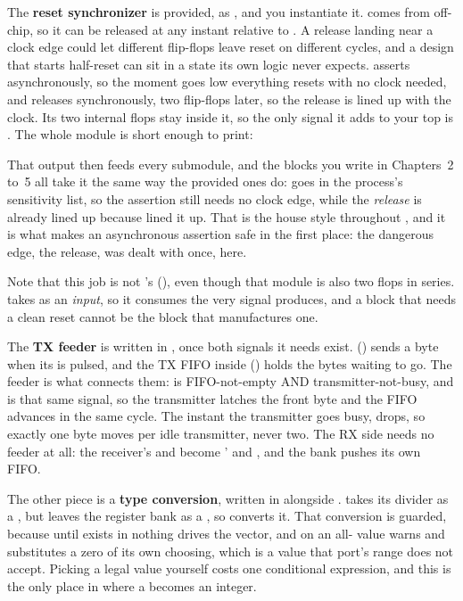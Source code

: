 The \textbf{reset synchronizer} is provided, as , and you instantiate it.
 comes from off-chip, so it can be released at any instant relative to . A
release landing near a clock edge could let different flip-flops leave reset on different cycles,
and a design that starts half-reset can sit in a state its own logic never expects.
 asserts asynchronously, so the moment  goes low everything resets
with no clock needed, and releases synchronously, two flip-flops later, so the release is lined up
with the clock. Its two internal flops stay inside it, so the only signal it adds to your top is
. The whole module is short enough to print:


\noindent That output then feeds every submodule, and the blocks you write in Chapters~2 to~5 all
take it the same way the provided ones do:  goes in the process's sensitivity
list, so the assertion still needs no clock edge, while the \emph{release} is already lined up
because  lined it up. That is the house style throughout , and it is what
makes an asynchronous assertion safe in the first place: the dangerous edge, the release, was dealt
with once, here.

Note that this job is not 's (), even though that module is also two flops in
series.  takes  as an \emph{input}, so it consumes the very signal
 produces, and a block that needs a clean reset cannot be the block that
manufactures one.

The \textbf{TX feeder} is written in , once both signals it needs exist. 
() sends a byte when its  is pulsed, and the TX FIFO inside 
() holds the bytes waiting to go. The feeder is what connects them:  is
FIFO-not-empty AND transmitter-not-busy, and  is that same signal, so the transmitter
latches the front byte and the FIFO advances in the same cycle. The instant the transmitter goes
busy,  drops, so exactly one byte moves per idle transmitter, never two. The RX side
needs no feeder at all: the receiver's  and  become '
 and , and the bank pushes its own FIFO.

The other piece is a \textbf{type conversion}, written in  alongside .
 takes its divider as a , but  leaves
the register bank as a , so  converts it. That
conversion is guarded, because until  exists in  nothing drives the
vector, and  on an all- value warns and substitutes a zero of its own
choosing, which is a value that port's range does not accept. Picking a legal value yourself costs
one conditional expression, and this is the only place in  where a
 becomes an integer.

